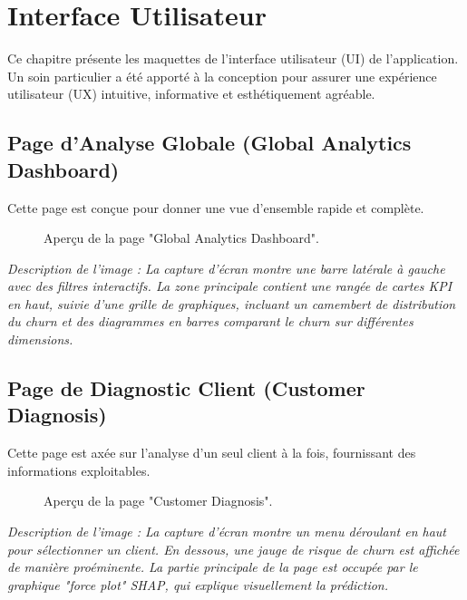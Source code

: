 \chapter{Interface Utilisateur}
\label{chap:interface_utilisateur}

Ce chapitre présente les maquettes de l'interface utilisateur (UI) de l'application. Un soin particulier a été apporté à la conception pour assurer une expérience utilisateur (UX) intuitive, informative et esthétiquement agréable.

\section{Page d'Analyse Globale (Global Analytics Dashboard)}
Cette page est conçue pour donner une vue d'ensemble rapide et complète.

\begin{figure}[H]
    \centering
    \caption{Aperçu de la page "Global Analytics Dashboard".}
    \label{fig:ui_global_analytics}
\end{figure}

\textit{Description de l'image : La capture d'écran montre une barre latérale à gauche avec des filtres interactifs. La zone principale contient une rangée de cartes KPI en haut, suivie d'une grille de graphiques, incluant un camembert de distribution du churn et des diagrammes en barres comparant le churn sur différentes dimensions.}

\section{Page de Diagnostic Client (Customer Diagnosis)}
Cette page est axée sur l'analyse d'un seul client à la fois, fournissant des informations exploitables.

\begin{figure}[H]
    \centering
    \caption{Aperçu de la page "Customer Diagnosis".}
    \label{fig:ui_customer_diagnosis}
\end{figure}

\textit{Description de l'image : La capture d'écran montre un menu déroulant en haut pour sélectionner un client. En dessous, une jauge de risque de churn est affichée de manière proéminente. La partie principale de la page est occupée par le graphique "force plot" SHAP, qui explique visuellement la prédiction.}

